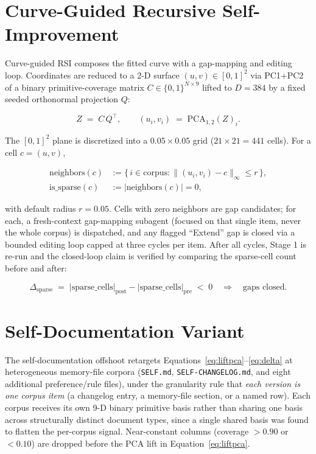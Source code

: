 \documentclass[11pt]{article}
\begin{document}
\section{Curve-Guided Recursive Self-Improvement}
\label{sec:rsi}

Curve-guided RSI composes the fitted curve with a gap-mapping and editing
loop. Coordinates are reduced to a 2-D surface $(u, v) \in [0,1]^2$ via
PC1+PC2 of a binary primitive-coverage matrix $C \in \{0,1\}^{N \times 9}$
lifted to $D = 384$ by a fixed seeded orthonormal projection $Q$:

\begin{equation}
Z \;=\; C \, Q^\top, \qquad (u_i, v_i) \;=\; \mathrm{PCA}_{1,2}(Z)_i.
\label{eq:liftpca}
\end{equation}

The $[0,1]^2$ plane is discretized into a $0.05 \times 0.05$ grid
($21 \times 21 = 441$ cells). For a cell $c = (u, v)$,

\begin{align}
\mathrm{neighbors}(c) &:= \big\{\, i \in \mathrm{corpus} : \| (u_i, v_i) - c \|_\infty \le r \,\big\}, \label{eq:neighbors}\\
\mathrm{is\_sparse}(c) &:= \big| \mathrm{neighbors}(c) \big| = 0, \label{eq:sparse}
\end{align}

with default radius $r = 0.05$. Cells with zero neighbors are gap
candidates; for each, a fresh-context gap-mapping subagent (focused on that
single item, never the whole corpus) is dispatched, and any flagged
``Extend'' gap is closed via a bounded editing loop capped at three cycles
per item. After all cycles, Stage 1 is re-run and the closed-loop claim is
verified by comparing the sparse-cell count before and after:

\begin{equation}
\Delta_{\mathrm{sparse}} \;=\; |\mathrm{sparse\_cells}|_{\mathrm{post}} - |\mathrm{sparse\_cells}|_{\mathrm{pre}} \;<\; 0
\quad\Longrightarrow\quad \text{gaps closed.}
\label{eq:delta}
\end{equation}

\section{Self-Documentation Variant}
\label{sec:self}

The self-documentation offshoot retargets Equations~\ref{eq:liftpca}–\ref{eq:delta}
at heterogeneous memory-file corpora (\texttt{SELF.md},
\texttt{SELF-CHANGELOG.md}, and eight additional preference/rule files),
under the granularity rule that \emph{each version is one corpus item}
(a changelog entry, a memory-file section, or a named row). Each corpus
receives its own 9-D binary primitive basis rather than sharing one basis
across structurally distinct document types, since a single shared basis was
found to flatten the per-corpus signal. Near-constant columns (coverage
$> 0.90$ or $< 0.10$) are dropped before the PCA lift in
Equation~\ref{eq:liftpca}.
\end{document}
